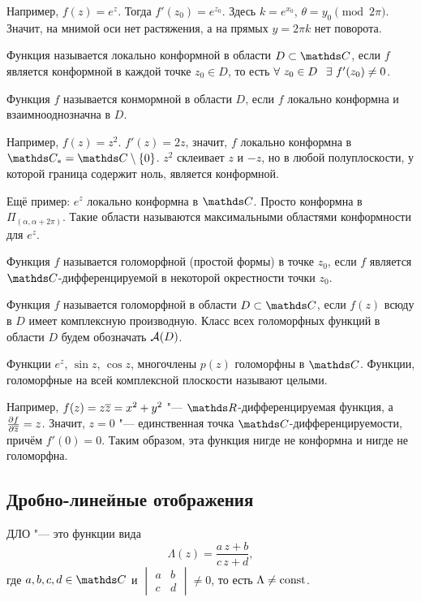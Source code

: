 Например, $f(z) =e^z$. Тогда $f'(z_0) = e^{z_0}$. Здесь $k = e^{x_0}$, $\theta = y_0\pmod{2\pi}$. Значит, на мнимой оси нет растяжения, а на прямых $y = 2\pi k$ нет поворота.

\begin{Def}
	Функция называется локально конформной в области $D\subset \C$, если $f$ является конформной в каждой точке $z_0\in D$, то есть $\forall\ z_0\in D\pau \exists\ f'(z_0)\ne 0$.
\end{Def}
\begin{Def}
	Функция $f$ называется конмормной в области $D$, если $f$ локально конформна и взаимнооднозначна в $D$.
\end{Def}
Например, $f(z) = z^2$. $f'(z) = 2z$, значит, $f$ локально конформна в $\C_* = \C\dd\{0\}$. $z^2$ склеивает $z$ и $-z$, но в любой полуплоскости, у которой граница содержит ноль, является конформной.

Ещё пример: $e^z$ локально конформна в $\C$. Просто конформна в $\Pi_{(\alpha,\alpha+2\pi)}$. Такие области называются максимальными областями конформности для $e^z$.
\begin{Def}
	Функция $f$ называется голоморфной (простой формы) в точке $z_0$, если $f$ является $\C$-дифференцируемой в некоторой окрестности точки $z_0$.
\end{Def}
\begin{Def}
	Функция $f$ называется голоморфной в области $D\subset \C$, если $f(z)$ всюду в $D$ имеет комплексную производную. Класс всех голоморфных функций в области $D$ будем обозначать $\mathcal A(D)$.
\end{Def}
Функции $e^z$, $\sin z$, $\cos z$, многочлены $p(z)$ голоморфны в $\C$. Функции, голоморфные на всей комплексной плоскости называют целыми.

Например, $f(z) = z\overline{z} = x^2+y^2$ "--- $\R$-дифференцируемая функция, а $\frac{\partial f}{\partial \overline{z}} = z$. Значит, $z=0$ "--- единственная точка $\C$-дифференцируемости, причём $f'(0) = 0$. Таким образом, эта функция нигде не конформна и нигде не голоморфна.
\subsection{Дробно-линейные отображения}
\begin{Def}
	ДЛО "--- это функции вида
	\[
		\Lambda(z) = \frac{a\,z + b}{c\,z + d},
	\]
	где $a,b,c,d\in\C$ и $\begin{vmatrix}
		a&b\\c&d
	\end{vmatrix}\ne0$, то есть $\Lambda\ne\operatorname{const}$.
\end{Def}

